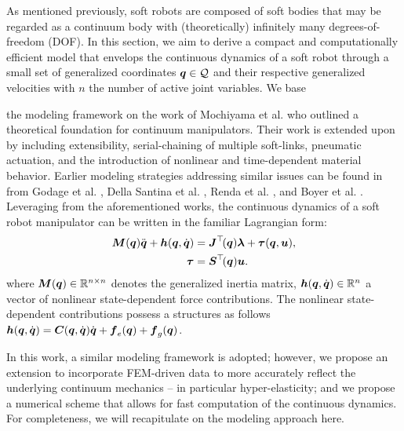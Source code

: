As mentioned previously, soft robots are composed of soft bodies that may be regarded as a continuum body with (theoretically) infinitely many degrees-of-freedom (DOF). In this section, we aim to derive a compact and computationally efficient model that envelops the continuous dynamics of a soft robot through a small set of generalized coordinates ${\boldsymbol{q}}\in\mathcal{Q}$ and their respective generalized velocities  with $n$ the number of active joint variables. We base {the modeling framework on the work of Mochiyama et al.\cite{Mochiyama2003} who outlined a theoretical foundation for continuum manipulators. Their work is extended upon by including extensibility, serial-chaining of multiple soft-links, pneumatic actuation, and the introduction of nonlinear and time-dependent material behavior. Earlier modeling strategies addressing similar issues can be found in from Godage et al. \cite{Godage2015,Godage2016}, Della Santina et al. \cite{Santina2020,Santina2020b,Santina2020Pcc}, Renda et al. \cite{Renda2018}, and Boyer et al. \cite{Boyer2021}. Leveraging from the aforementioned works, the continuous dynamics of a soft robot manipulator can be written in the familiar Lagrangian form:
%
\begin{align}
\boldsymbol{M}({\boldsymbol{q}}) {\ddot{\boldsymbol{q}}} + \boldsymbol{h}({\boldsymbol{q}},{\dot{\boldsymbol{q}}}) & = \boldsymbol{J}^\top\!({\boldsymbol{q}}) \boldsymbol{\lambda} + \boldsymbol{\tau}({\boldsymbol{q}},\boldsymbol{u}), \\
\boldsymbol{\tau} & = \boldsymbol{S}^\top\!({\boldsymbol{q}}) \boldsymbol{u}.
\end{align}
%
where $\boldsymbol{M}({\boldsymbol{q}})  \in \mathbb{R}^{n\times n}$ denotes the generalized inertia matrix, $\boldsymbol{h}({\boldsymbol{q}},{\dot{\boldsymbol{q}}}) \in \mathbb{R}^n$ a vector of nonlinear state-dependent force contributions. The nonlinear state-dependent contributions possess a structures as follows $\boldsymbol{h}({\boldsymbol{q}},{\dot{\boldsymbol{q}}}) = \boldsymbol{C}({\boldsymbol{q}},{\dot{\boldsymbol{q}}}){\dot{\boldsymbol{q}}} + \boldsymbol{f}_e({\boldsymbol{q}}) + \boldsymbol{f}_g({\boldsymbol{q}})$.

In this work, a similar modeling framework is adopted; however, we propose an extension to incorporate FEM-driven data to more accurately reflect the underlying continuum mechanics -- in particular hyper-elasticity; and we propose a numerical scheme that allows for fast computation of the continuous dynamics. For completeness, we will recapitulate on the modeling approach here.

\newpage
}
